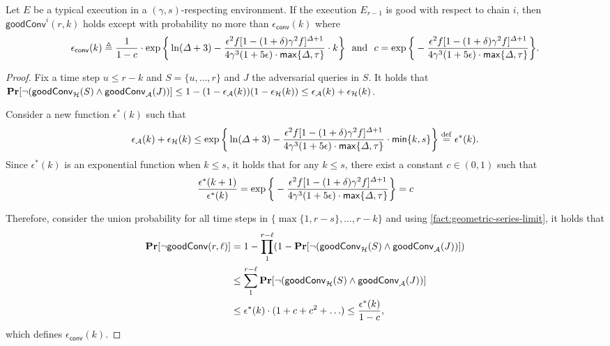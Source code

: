 \begin{lemma} \label{lemma:good-conv-single-chain}
    Let $E$ be a typical execution in a $(\gamma, s)$-respecting environment.
    If the execution $E_{r - 1}$ is good with respect to chain $i$, then $\mathsf{goodConv}^i(r, k)$ holds except with probability no more than $\epsilon_{\mathsf{conv}}(k)$ where
    \[
        \epsilon_{\mathsf{conv}}(k) \triangleq \frac{1}{1 - c} \cdot \exp \bigg\{ \ln (\varDelta + 3) - \frac{\epsilon^2 f [1 - (1 + \delta) \gamma^2 f]^{\varDelta + 1}}{4 \gamma^3 (1 + 5\epsilon) \cdot \mathsf{max} \{ \varDelta, \tau \}} \cdot k \bigg\}
        ~~\text{and}~~
        c =  \exp \bigg\{- \frac{\epsilon^2 f [1 - (1 + \delta) \gamma^2 f]^{\varDelta + 1}}{4 \gamma^3 (1 + 5\epsilon) \cdot \mathsf{max} \{ \varDelta, \tau \}} \bigg\}.
    \]
\end{lemma}

\begin{proof}
    Fix a time step $u \le r - k$ and $S = \{u, \ldots, r \}$ and $J$ the adversarial queries in $S$.
    It holds that $\mathbf{Pr}[\neg (\mathsf{goodConv}_{\mathcal{H}}(S) \wedge \mathsf{goodConv}_{\mathcal{A}}(J))] \le 1 - (1 - \epsilon_\mathcal{A}(k))(1 - \epsilon_{\mathcal{H}}(k)) \le \epsilon_\mathcal{A}(k) + \epsilon_\mathcal{H}(k)$.

    Consider a new function $\epsilon^*(k)$ such that
    \[ \epsilon_\mathcal{A}(k) + \epsilon_\mathcal{H}(k) \le \exp \bigg\{ \ln (\varDelta + 3) - \frac{\epsilon^2 f [1 - (1 + \delta) \gamma^2 f]^{\varDelta + 1}}{4 \gamma^3 (1 + 5\epsilon) \cdot \mathsf{max} \{ \varDelta, \tau \}} \cdot \mathsf{min} \{k, s\} \bigg\} \overset{\mathrm{def}}{=} \epsilon^*(k). \]
    Since $\epsilon^*(k)$ is an exponential function when $k \le s$, it holds that for any $k \le s$, there exist a constant $c \in (0, 1)$ such that
    \[ \frac{\epsilon^*(k + 1)}{\epsilon^*(k)} = \exp \bigg\{- \frac{\epsilon^2 f [1 - (1 + \delta) \gamma^2 f]^{\varDelta + 1}}{4 \gamma^3 (1 + 5\epsilon) \cdot \mathsf{max} \{ \varDelta, \tau \}} \bigg\} = c \]

    Therefore, consider the union probability for all time steps in $\{ \max\{ 1, r - s\}, \ldots, r - k\}$ and using \cref{fact:geometric-series-limit}, it holds that
    \begin{align*}
        \mathbf{Pr}[\neg \mathsf{goodConv}(r, \ell)]
         & =
        1 - \prod_{1}^{r - \ell} (1 - \mathbf{Pr}[\neg (\mathsf{goodConv}_{\mathcal{H}}(S) \wedge \mathsf{goodConv}_{\mathcal{A}}(J))])
        \\
         & \le
        \sum_{1}^{r - \ell} \mathbf{Pr}[\neg (\mathsf{goodConv}_{\mathcal{H}}(S) \wedge \mathsf{goodConv}_{\mathcal{A}}(J))]
        \\
         & \le
        \epsilon^*(k) \cdot (1 + c + c^2 + \ldots)
        \le
        \frac{ \epsilon^*(k) }{1 - c},
    \end{align*}
    which defines $\epsilon_{\mathsf{conv}}(k)$.
\end{proof}

